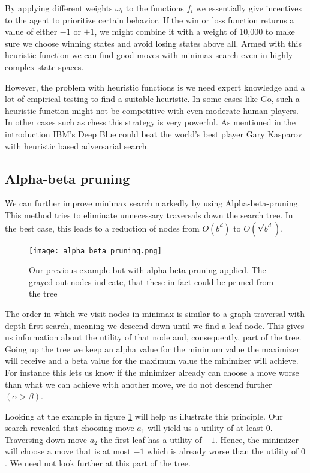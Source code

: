 By applying different weights $ \omega_i $ to the functions $ f_i $ we essentially give incentives to the agent to prioritize certain behavior. If the win or loss function returns a value of either $-1$ or $+1$, we might combine it with a weight of 10,000 to make sure we choose winning states and avoid losing states above all. Armed with this heuristic function we can find good moves with minimax search even in highly complex state spaces.

However, the problem with heuristic functions is we need expert knowledge and a lot of empirical testing to find a suitable heuristic. In some cases like Go, such a heuristic function might not be competitive with even moderate human players. In other cases such as chess this strategy is very powerful. As mentioned in the introduction IBM's Deep Blue could beat the world's best player Gary Kasparov with heuristic based adversarial search.

\subsection{Alpha-beta pruning}
We can further improve minimax search markedly by using Alpha-beta-pruning. This method tries to eliminate unnecessary traversals down the search tree. In the best case, this leads to a reduction of nodes from $ O(b^d) $ to $ O(\sqrt{b^d}) $.

\begin{figure}
    \centering
    \texttt{[image: alpha\_beta\_pruning.png]}
    \caption{Our previous example but with alpha beta pruning applied. The grayed out nodes indicate, that these in fact could be pruned from the tree}
    \label{alpha_beta_pruning}
\end{figure}

The order in which we visit nodes in minimax is similar to a graph traversal with depth first search, meaning we descend down until we find a leaf node. This gives us information about the utility of that node and, consequently, part of the tree. Going up the tree we keep an alpha value for the minimum value the maximizer will receive and a beta value for the maximum value the minimizer will achieve. For instance this lets us know if the minimizer already can choose a move worse than what we can achieve with another move, we do not descend further $ (\alpha > \beta) $.

Looking at the example in figure \ref{alpha_beta_pruning} will help us illustrate this principle. Our search revealed that choosing move $ a_1 $ will yield us a utility of at least $0$. Traversing down move $ a_2 $ the first leaf has a utility of $-1$. Hence, the minimizer will choose a move that is at most $-1$ which is already worse than the utility of $0$. We need not look further at this part of the tree.

